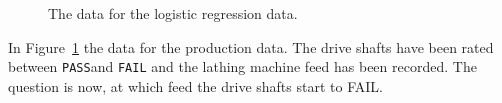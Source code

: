 \documentclass[
  a4paper,
]{scrbook}
\begin{document}
\begin{figure}[H]


\caption{\label{fig-logreg-data}The data for the logistic regression
data.}

\end{figure}%

In Figure~\ref{fig-logreg-data} the data for the production data. The
drive shafts have been rated between \texttt{PASS}and \texttt{FAIL} and
the lathing machine feed has been recorded. The question is now, at
which feed the drive shafts start to FAIL.

\begin{table}

\caption{\label{tbl-logreg-eda}The overview of the logistic regression
data.}


\end{table}%
\end{document}
